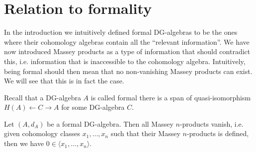 \section{Relation to formality}

In the introduction we intuitively defined formal DG-algebras to be the ones where their cohomology algebras contain all the ``relevant information''.  We have now introduced Massey products as a type of information that should contradict this, i.e. information that is inaccessible to the cohomology algebra. Intuitively, being formal should then mean that no non-vanishing Massey products can exist. We will see that this is in fact the case.



Recall that a DG-algebra $A$ is called formal there is a span of quasi-isomorphism $H(A)\leftarrow C \rightarrow A$ for some DG-algebra $C$. 

\begin{theorem}
\label{thm:formal_no_massey}
Let $(A, d_A)$ be a formal DG-algebra. Then all Massey $n$-products vanish, i.e. given cohomology classes $x_1, \ldots, x_n$ such that their Massey $n$-products is defined, then we have $0\in \langle x_1, \ldots, x_n\rangle$. 
\end{theorem}

